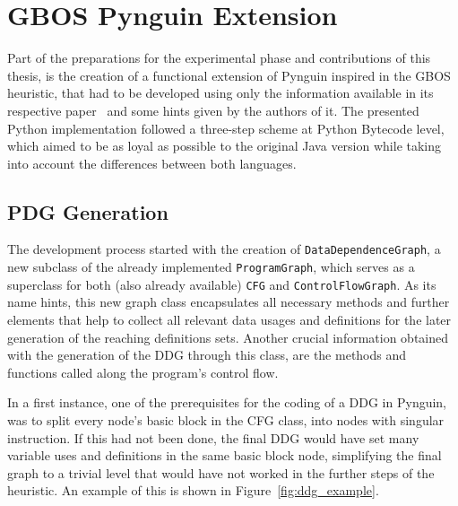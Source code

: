 \documentclass[%
  chapterprefix=false,%
  open=right,%
  twoside=true,%
  paper=a4,%
  logofile={Figures/logo.png},%
  thesistype=master,%
  UKenglish,%
]{se2thesis}
\newcommand{\classname}[1]{\texttt{#1}}
\begin{document}
\chapter{GBOS Pynguin Extension}\label{chap:implementation}

Part of the preparations for the experimental phase and contributions of this thesis, is the creation of a functional extension of Pynguin inspired in the GBOS heuristic, that had to be developed using only the information available in its respective paper~\cite{DBLP:conf/sigsoft/0001O00D21} and some hints given by the authors of it.
The presented Python implementation followed a three-step scheme at Python Bytecode level, which aimed to be as loyal as possible to the original Java version while taking into account the differences between both languages.

\section{PDG Generation}

The development process started with the creation of \classname{DataDependenceGraph}, a new subclass of the already implemented \classname{ProgramGraph}, which serves as a superclass for both (also already available) \classname{CFG} and \classname{ControlFlowGraph}.
As its name hints, this new graph class encapsulates all necessary methods and further elements that help to collect all relevant data usages and definitions for the later generation of the reaching definitions sets.
Another crucial information obtained with the generation of the DDG through this class, are the methods and functions called along the program's control flow.  

In a first instance, one of the prerequisites for the coding of a DDG in Pynguin, was to split every node's basic block in the CFG class, into nodes with singular instruction.
If this had not been done, the final DDG would have set many variable uses and definitions in the same basic block node, simplifying the final graph to a trivial level that would have not worked in the further steps of the heuristic.
An example of this is shown in Figure~\ref{fig:ddg_example}.

\begin{figure}[htb]
  
\end{figure}
\end{document}
